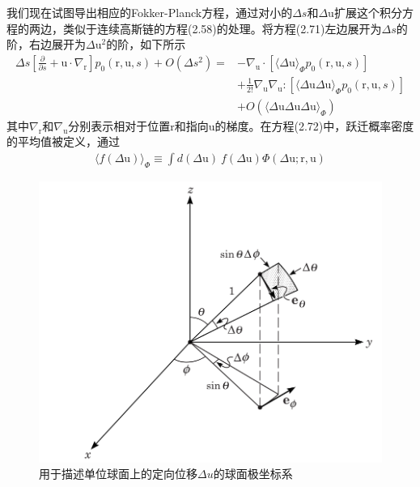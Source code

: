 我们现在试图导出相应的Fokker-Planck方程，通过对小的$\Delta s$和$\Delta \mathrm{u}$扩展这个积分方程的两边，类似于连续高斯链的方程(2.58)的处理。将方程(2.71)左边展开为$\Delta s$的阶，右边展开为$\Delta \mathrm{u}^2$的阶，如下所示\\
\begin{equation}
\begin{aligned}
\Delta s \left[\frac{\partial}{\partial s}+\mathrm{u}\cdot\nabla_\mathrm{r}\right]p_0(\mathrm{r},\mathrm{u},s)+O(\Delta s^2)=&-\nabla_\mathrm{u} \cdot [\langle \Delta \mathrm{u}\rangle_\Phi p_0(\mathrm{r},\mathrm{u},s)]\\&+\frac{1}{2!}\nabla_\mathrm{u} \nabla_\mathrm{u} :[\langle\Delta \mathrm{u}\Delta \mathrm{u} \rangle_\Phi p_0(\mathrm{r},\mathrm{u},s)]\\&+O(\langle \Delta \mathrm{u} \Delta \mathrm{u}\Delta \mathrm{u}\rangle_\Phi)
\end{aligned}
\end{equation}
其中$\nabla_\mathrm{r}$和$\nabla_\mathrm{u}$分别表示相对于位置$\mathrm{r}$和指向$\mathrm{u}$的梯度。在方程(2.72)中，跃迁概率密度的平均值被定义，通过
\begin{gather}
\langle f(\Delta \mathrm{u})\rangle _\Phi\equiv\int d(\Delta \mathrm{u})\ f(\Delta \mathrm{u} )\Phi(\Delta \mathrm{u};\mathrm{r},\mathrm{u})
\end{gather}
\begin{figure}[H]
	\centering   
	\includegraphics[width=12cm]{./figures/7.png}
	\caption{用于描述单位球面上的定向位移$\Delta u$的球面极坐标系}
\end{figure}

